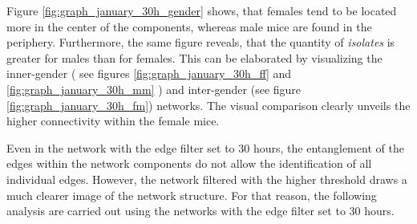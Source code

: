 Figure \ref{fig:graph_january_30h_gender} shows, that females tend to be located more in the center of the components, whereas male mice are found in the periphery. Furthermore, the same figure reveals, that the quantity of \textit{isolates} is greater for males than for females. This can be elaborated by visualizing the inner-gender ( see figures \ref{fig:graph_january_30h_ff} and \ref{fig:graph_january_30h_mm} ) and inter-gender (see figure \ref{fig:graph_january_30h_fm}) networks. The visual comparison clearly unveils the higher connectivity within the female mice.

Even in the network with the edge filter set to 30 hours, the entanglement of the edges within the network components do not allow the identification of all individual edges. However, the network filtered with the higher threshold draws a much clearer image of the network structure. For that reason, the following analysis are carried out using the networks with the edge filter set to 30 hours.

